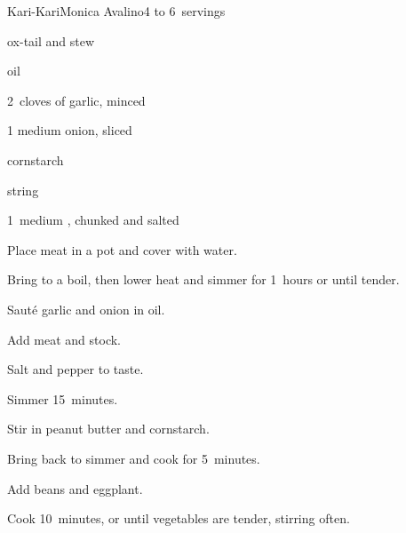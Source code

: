 \begin{recipe}{Kari-Kari}{Monica Avalino}{4 to 6~servings}

\begin{ingredients}
\item \lbs{2\half} ox-tail and stew 
\item {} oil
\item 2~cloves of garlic, minced
\item 1 medium onion, sliced
\item {} 
\item {} cornstarch
\item \lbs{\half} string 
\item 1~medium , chunked and salted
\end{ingredients}

\begin{directions}
\item Place meat in a pot and cover with water.
\item Bring to a boil, then lower heat and simmer for 1\half~hours or until tender.
\item Sauté garlic and onion in oil.
\item Add meat and stock.
\item Salt and pepper to taste.
\item Simmer 15~minutes.
\item Stir in peanut butter and cornstarch.
\item Bring back to simmer and cook for 5~minutes.
\item Add beans and eggplant.
\item Cook 10~minutes, or until vegetables are tender, stirring often.
\end{directions}

\end{recipe}
